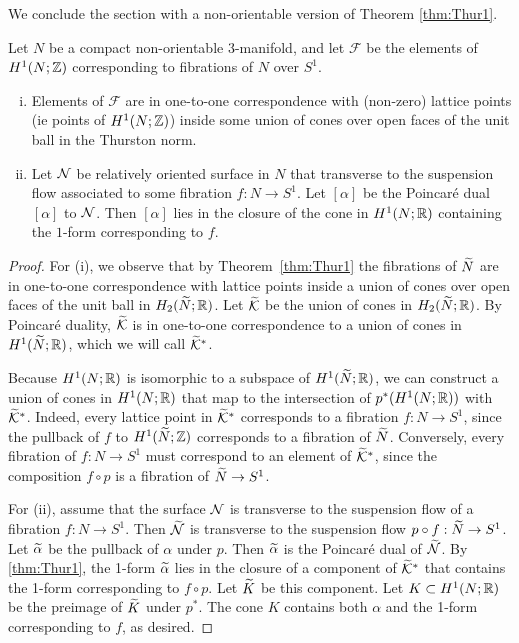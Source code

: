 We conclude the section with a non-orientable version of Theorem \ref{thm:Thur1}.
\begin{thm}
  \label{thm:classifying-fibrations}
  Let $N$ be a compact non-orientable $3$-manifold, and let $\mathcal{F}$ be the elements of $H^1(N; \mathbb{Z})$ corresponding to fibrations of $N$ over $S^1$.
  \begin{enumerate}[(i)]
  \item Elements of $\mathcal{F}$ are in one-to-one correspondence with (non-zero) lattice points (ie points of $H^1(N; \mathbb{Z})$) inside some union of cones over open faces of the unit ball in the Thurston norm.
  \item Let $\mathcal{N}$ be relatively oriented surface in $N$ that transverse to the suspension flow associated to some fibration $f: N \to S^1$.  Let $[\alpha]$ be the Poincar\'e dual $[\alpha]$ to $\mathcal{N}$.  Then $[\alpha]$ lies in the closure of the cone in $H^1(N; \mathbb{R})$ containing the $1$-form corresponding to $f$.
  \end{enumerate}
\end{thm}
\begin{proof}
For (i), we observe that by Theorem~\ref{thm:Thur1} the fibrations of $\widetilde{N}$ are in one-to-one correspondence with lattice points inside a union of cones over open faces of the unit ball in $H_2(\widetilde{N};\mathbb{R})$.  Let $\widetilde{\mathcal{K}}$ be the union of cones in $H_2(\widetilde{N};\mathbb{R})$.
 By Poincar\'e duality, $\widetilde{\mathcal{K}}$ is in one-to-one correspondence to a union of cones in $H^1(\widetilde{N};\mathbb{R})$, which we will call $\widetilde{\mathcal{K}}^\ast$.

  Because $H^1(N;\mathbb{R})$ is isomorphic to a subspace of $H^1(\widetilde{N};\mathbb{R})$, we can construct a union of cones in $H^1(N; \mathbb{R})$ that map to the intersection of $p^\ast(H^1(N; \mathbb{R}))$ with $\widetilde{\mathcal{K}}^\ast$.
  Indeed, every lattice point in $\widetilde{\mathcal{K}}^\ast$ corresponds to a fibration $f:N\to S^1$, since the pullback of $f$ to $H^1(\widetilde{N}; \mathbb{Z})$ corresponds to a fibration of $\widetilde{N}$.
  Conversely, every fibration of $f:N\rightarrow S^1$ must correspond to an element of $\widetilde{\mathcal{K}}^\ast$, since the composition $f\circ p$ is a fibration of $\widetilde{N}\rightarrow S^1$.

  For (ii), assume that the surface $\mathcal{N}$ is transverse to the suspension flow of a fibration $f:N\rightarrow S^1$. Then $\widetilde{\mathcal{N}}$ is transverse to the suspension flow $p \circ f:\widetilde{N}\rightarrow S^1$.  Let $\widetilde{\alpha}$ be the pullback of $\alpha$ under $p$.  Then $\widetilde{\alpha}$ is the Poincar\'e dual of $\widetilde{\mathcal{N}}$.  By \autoref{thm:Thur1}, the 1-form $\widetilde{\alpha}$ lies in the closure of a component of $\widetilde{\mathcal{K}}^\ast$ that contains the 1-form corresponding to $f\circ p$.  Let $\widetilde{K}$ be this component.  Let $K\subset H^1(N;\mathbb{R})$ be the preimage of $\widetilde{K}$ under $p^\ast$.  The cone $K$ contains both $\alpha$ and the 1-form corresponding to $f$, as desired.
\end{proof}

